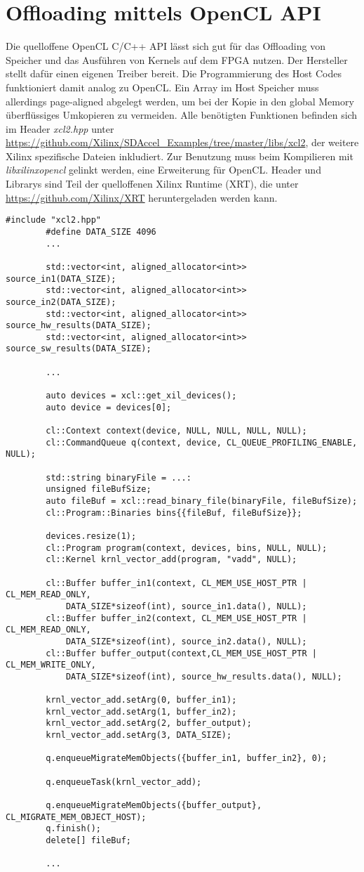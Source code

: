 		\section{Offloading mittels OpenCL API}
		Die quelloffene OpenCL C/C++ \Gls{API} lässt sich gut für das Offloading von Speicher und das Ausführen von \Glspl{Kernel} auf dem FPGA nutzen. Der Hersteller stellt dafür einen eigenen Treiber bereit. Die Programmierung des Host Codes funktioniert damit analog zu OpenCL. Ein Array im Host Speicher muss allerdings page-aligned abgelegt werden, um bei der Kopie in den \gls{global Memory} überflüssiges Umkopieren zu vermeiden. Alle benötigten Funktionen befinden sich im Header \textit{xcl2.hpp} unter \url{https://github.com/Xilinx/SDAccel_Examples/tree/master/libs/xcl2}, der weitere Xilinx spezifische Dateien inkludiert. Zur Benutzung muss beim Kompilieren mit \textit{libxilinxopencl} gelinkt werden, eine Erweiterung für OpenCL. Header und Librarys sind Teil der quelloffenen Xilinx Runtime (XRT), die unter \url{https://github.com/Xilinx/XRT} heruntergeladen werden kann.		
		\begin{lstlisting}[caption=FPGA: Host Programm]
		#include "xcl2.hpp"
		#define DATA_SIZE 4096
		...

		std::vector<int, aligned_allocator<int>> source_in1(DATA_SIZE);
		std::vector<int, aligned_allocator<int>> source_in2(DATA_SIZE);
		std::vector<int, aligned_allocator<int>> source_hw_results(DATA_SIZE);
		std::vector<int, aligned_allocator<int>> source_sw_results(DATA_SIZE);

		...

		auto devices = xcl::get_xil_devices();
		auto device = devices[0];

		cl::Context context(device, NULL, NULL, NULL, NULL);
		cl::CommandQueue q(context, device, CL_QUEUE_PROFILING_ENABLE, NULL);

		std::string binaryFile = ...:
		unsigned fileBufSize;
		auto fileBuf = xcl::read_binary_file(binaryFile, fileBufSize);
		cl::Program::Binaries bins{{fileBuf, fileBufSize}};

		devices.resize(1);
		cl::Program program(context, devices, bins, NULL, NULL);
		cl::Kernel krnl_vector_add(program, "vadd", NULL);

		cl::Buffer buffer_in1(context, CL_MEM_USE_HOST_PTR | CL_MEM_READ_ONLY, 
			DATA_SIZE*sizeof(int), source_in1.data(), NULL);
		cl::Buffer buffer_in2(context, CL_MEM_USE_HOST_PTR | CL_MEM_READ_ONLY,
			DATA_SIZE*sizeof(int), source_in2.data(), NULL);
		cl::Buffer buffer_output(context,CL_MEM_USE_HOST_PTR | CL_MEM_WRITE_ONLY, 
			DATA_SIZE*sizeof(int), source_hw_results.data(), NULL);

		krnl_vector_add.setArg(0, buffer_in1);
		krnl_vector_add.setArg(1, buffer_in2);
		krnl_vector_add.setArg(2, buffer_output);
		krnl_vector_add.setArg(3, DATA_SIZE);

		q.enqueueMigrateMemObjects({buffer_in1, buffer_in2}, 0);

		q.enqueueTask(krnl_vector_add);

		q.enqueueMigrateMemObjects({buffer_output}, CL_MIGRATE_MEM_OBJECT_HOST);
		q.finish();
		delete[] fileBuf;
    
		...	
		\end{lstlisting}
		

